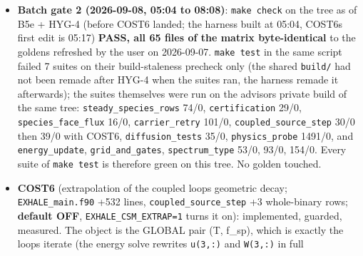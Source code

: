 \documentclass[english,a4paper]{my_memo}
\begin{document}
\begin{itemize}
  agree to every printed digit, iteration 6 differs, the two runs then
  diverge; some module state survives a probe \texttt{eval\_residual}; the same root
  writes \texttt{n\_eq\_sweeps\_model} and the frozen background); and the ray test
  can refuse a step that reduced the merit far MORE than the model promised
  (\texttt{ratio\ =\ 7187}), which Algorithm 4.1 of Nocedal and Wright never does,
  the obvious amendment (gate it on \texttt{ratio\ \textless{}=\ eta\_accept}) left unmade for
  want of a control measurement. The worker was stopped by a rate limit
  after writing its report; advisor verified the tree: build clean; suites
  \texttt{steady\_species\_rows} 74/0 (six new driver rows), \texttt{certification} 29/0,
  \texttt{species\_face\_flux} 16/0, \texttt{carrier\_retry} 101/0, \texttt{coupled\_source\_step}
  30/0; one "per-iteration" phrase in \texttt{run.sh} reworded; \texttt{wasp\_full\_newton} re-run by the advisor against its golden with the B5e binary: all four files byte-identical, info 0, CERTIFIED, log10 Mdot 13.30.
\item
  \textbf{Batch gate 2 (2026-09-08, 05:04 to 08:08)}: \texttt{make\ check} on the tree
  as of B5e + HYG-4 (before COST6 landed; the harness built at 05:04, COST6\textquotesingle s
  first edit is 05:17) \textbf{PASS, all 65 files of the matrix byte-identical}
  to the goldens refreshed by the user on 2026-09-07. \texttt{make\ test} in the
  same script failed 7 suites on their build-staleness precheck only (the
  shared \texttt{build/} had not been remade after HYG-4 when the suites ran, the
  harness remade it afterwards); the suites themselves were run on the
  advisor\textquotesingle s private build of the same tree: \texttt{steady\_species\_rows} 74/0,
  \texttt{certification} 29/0, \texttt{species\_face\_flux} 16/0, \texttt{carrier\_retry} 101/0,
  \texttt{coupled\_source\_step} 30/0 then 39/0 with COST6, \texttt{diffusion\_tests} 35/0,
  \texttt{physics\_probe} 1491/0, and \texttt{energy\_update}, \texttt{grid\_and\_gates},
  \texttt{spectrum\_type} 53/0, 93/0, 154/0. Every suite of \texttt{make\ test} is therefore green on this tree. No golden touched.
\item
  \textbf{COST6} (extrapolation of the coupled loop\textquotesingle s geometric decay;
  \texttt{EXHALE\_main.f90} +532 lines, \texttt{coupled\_source\_step} +3 whole-binary rows;
  \textbf{default OFF}, \texttt{EXHALE\_CSM\_EXTRAP=1} turns it on): implemented, guarded,
  measured. The object is the GLOBAL pair (T, f\_sp), which is exactly the
  loop\textquotesingle s iterate (the energy solve rewrites \texttt{u(3,:)} and \texttt{W(3,:)} in full

\end{itemize}
\end{document}
